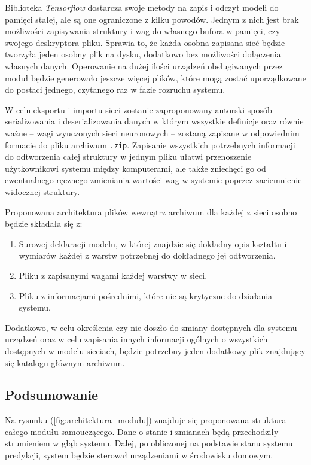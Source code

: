 Biblioteka \textit{Tensorflow} dostarcza swoje metody na zapis i odczyt modeli do pamięci stałej, ale są one ograniczone z kilku powodów. Jednym z nich jest brak możliwości zapisywania struktury i wag do własnego bufora w pamięci, czy swojego deskryptora pliku. Sprawia to, że każda osobna zapisana sieć będzie tworzyła jeden osobny plik na dysku, dodatkowo bez możliwości dołączenia własnych danych. Operowanie na dużej ilości urządzeń obsługiwanych przez moduł będzie generowało jeszcze więcej plików, które mogą zostać uporządkowane do postaci jednego, czytanego raz w fazie rozruchu systemu.

W celu eksportu i importu sieci zostanie zaproponowany autorski sposób serializowania i deserializowania danych \cite{book:serialization_deserialization} w którym wszystkie definicje oraz równie ważne -- wagi wyuczonych sieci neuronowych -- zostaną zapisane w odpowiednim formacie do pliku archiwum \verb+.zip+. Zapisanie wszystkich potrzebnych informacji do odtworzenia całej struktury w jednym pliku ułatwi przenoszenie użytkownikowi systemu między komputerami, ale także zniechęci go od ewentualnego ręcznego zmieniania wartości wag w systemie poprzez zaciemnienie widocznej struktury.

Proponowana architektura plików wewnątrz archiwum dla każdej z sieci osobno będzie składała się z:
\begin{enumerate}
    \item Surowej deklaracji modelu, w której znajdzie się dokładny opis kształtu i wymiarów każdej z warstw potrzebnej do dokładnego jej odtworzenia.
    \item Pliku z zapisanymi wagami każdej warstwy w sieci.
    \item Pliku z informacjami pośrednimi, które nie są krytyczne do działania systemu.
\end{enumerate}

Dodatkowo, w celu określenia czy nie doszło do zmiany dostępnych dla systemu urządzeń oraz w celu zapisania innych informacji ogólnych o wszystkich dostępnych w modelu sieciach, będzie potrzebny jeden dodatkowy plik znajdujący się katalogu głównym archiwum.

\subsection{Podsumowanie}
Na rysunku (\ref{fig:architektura_modułu}) znajduje się proponowana struktura całego modułu samouczącego. Dane o stanie i zmianach będą przechodziły strumieniem w głąb systemu. Dalej, po obliczonej na podstawie stanu systemu predykcji, system będzie sterował urządzeniami w środowisku domowym.


